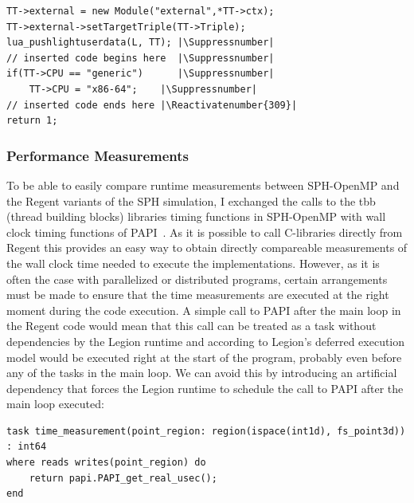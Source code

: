 \documentclass{article}      %
\begin{document}
\begin{lstlisting}[caption={Changes made to terra/src/tcompiler.cpp},label={lst:terra_changes}] 
TT->external = new Module("external",*TT->ctx);
TT->external->setTargetTriple(TT->Triple);
lua_pushlightuserdata(L, TT); |\Suppressnumber|
// inserted code begins here  |\Suppressnumber|
if(TT->CPU == "generic")      |\Suppressnumber|
	TT->CPU = "x86-64";    |\Suppressnumber|
// inserted code ends here |\Reactivatenumber{309}|
return 1;
\end{lstlisting}

\subsubsection{Performance Measurements}
To be able to easily compare runtime measurements between SPH-OpenMP and the Regent variants of the SPH simulation, I exchanged the calls to the tbb (thread building blocks) libraries timing functions in SPH-OpenMP with wall clock timing functions of PAPI~\cite{papi}. As it is possible to call C-libraries directly from Regent this provides an easy way to obtain directly compareable measurements of the wall clock time needed to execute the implementations. However, as it is often the case with parallelized or distributed programs, certain arrangements must be made to ensure that the time measurements are executed at the right moment during the code execution. A simple call to PAPI after the main loop in the Regent code would mean that this call can be treated as a task without dependencies by the Legion runtime and according to Legion's deferred execution model would be executed right at the start of the program, probably even before any of the tasks in the main loop. We can avoid this by introducing an artificial dependency that forces the Legion runtime to schedule the call to PAPI after the main loop executed:
\lstset{
	captionpos=b,
	style=regent,
	basicstyle=\scriptsize,
	numbers=left,
	numberstyle=\tiny,
	columns=fullflexible,
	numbers=none,
	stepnumber=1,
	escapeinside=||,
}
\begin{lstlisting}[frame=single,label={lst:time_measurement},
	caption={Task signature for the time measurement after execution of the main loop.}]
task time_measurement(point_region: region(ispace(int1d), fs_point3d)) : int64
where reads writes(point_region) do
	return papi.PAPI_get_real_usec();
end
\end{lstlisting}
\end{document}
